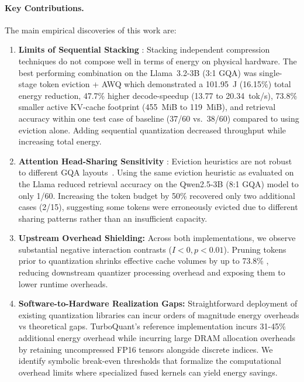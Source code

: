 \documentclass[sigconf,nonacm]{acmart}
\begin{document}
\paragraph{Key Contributions.}
The main empirical discoveries of this work are:
\begingroup\raggedright
\begin{enumerate}
  \item \textbf
   {Limits of Sequential Stacking} : Stacking independent compression techniques do not compose well in terms of energy on physical hardware. The best performing combination on the Llama~3.2-3B (3:1 GQA) was single-stage token eviction + AWQ which demonstrated a 101.95~J (16.15\%) total energy reduction, 47.7\% higher decode-speedup (13.77 to 20.34~tok/s), 73.8\% smaller active KV-cache footprint (455~MiB to 119~MiB), and retrieval accuracy within one test case of baseline (37/60 vs.\ 38/60) compared to using eviction alone. Adding sequential quantization decreased throughput while increasing total energy.

\item\textbf { Attention Head-Sharing Sensitivity} : Eviction heuristics are not robust to different GQA layouts~\cite{ainslie2023gqa}. Using the same eviction heuristic as evaluated on the Llama reduced retrieval accuracy on the Qwen2.5-3B (8:1 GQA) model to only 1/60. Increasing the token budget by 50\% recovered only two additional cases (2/15), suggesting some tokens were erroneously evicted due to different sharing patterns rather than an insufficient capacity.

  \item \textbf{Upstream Overhead Shielding:} Across both implementations, we observe substantial negative interaction contrasts ($I < 0, p < 0.01$). Pruning tokens prior to quantization shrinks effective cache volumes by up to 73.8\% , reducing downstream quantizer processing overhead and exposing them to lower runtime overheads.

 \item \textbf{Software-to-Hardware Realization Gaps:} Straightforward deployment of existing quantization libraries can incur orders of magnitude energy overheads vs theoretical gaps. TurboQuant's reference implementation incurs 31-45\% additional energy overhead while incurring large DRAM allocation overheads by retaining uncompressed FP16 tensors alongside discrete indices. We identify symbolic break-even thresholds that formalize the computational overhead limits where specialized fused kernels can yield energy savings.
\end{enumerate}
\endgroup
\end{document}
